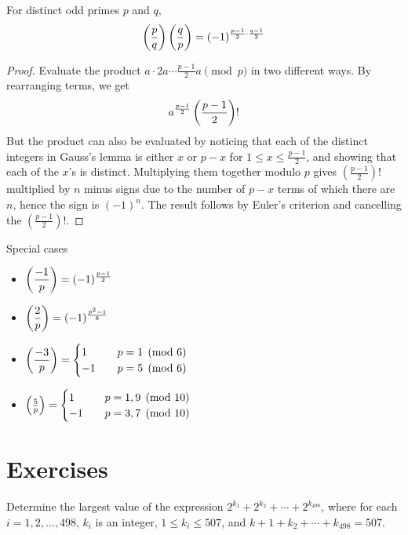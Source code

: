 \begin{theorem}
For distinct odd primes $p$ and $q$, 
\begin{equation}
\left(\dfrac{p}{q}\right) \left(\dfrac{q}{p}\right) = (-1)^{\frac{p-1}{2}\cdot\frac{q-1}{2}}
\end{equation}
\end{theorem}

\begin{proof}
Evaluate the product $a \cdot 2a \cdots \frac{p-1}{2}a \pmod p$ in two different ways. By rearranging terms, we get
\[a^\frac{p-1}{2} \left(\frac{p-1}{2}\right)!\]
But the product can also be evaluated by noticing that each of the distinct integers in Gauss's lemma is either $x$ or $p-x$ for $1 \le x \le \frac{p-1}{2}$, and showing that each of the $x$'s is distinct. Multiplying them together modulo $p$ gives $(\frac{p-1}{2})!$ multiplied by $n$ minus signs due to the number of $p-x$ terms of which there are $n$, hence the sign is $(-1)^n$. The result follows by Euler's criterion and cancelling the $(\frac{p-1}{2})!$.
\end{proof}

Special cases
\begin{itemize}
\item $\left(\dfrac{-1}{p}\right) = (-1)^{\frac{p-1}{2}}$
\item $\left(\dfrac{2}{p}\right) = (-1)^{\frac{p^2-1}{8}}$
\item $\left(\dfrac{-3}{p}\right) = \begin{cases}
    1 & \quad p=1\pmod 6 \\
    -1 & \quad p=5\pmod 6
\end{cases}$
\item $\left(\frac{5}{p}\right) = \begin{cases}
    1 & \quad p=1,9\pmod {10} \\
    -1 & \quad p=3,7\pmod {10}
\end{cases}$
\end{itemize}
\pagebreak

\section*{Exercises}
\begin{prbm}
\end{prbm}

\begin{prbm}
Determine the largest value of the expression $2^{k_1}+2^{k_2}+\cdots+2^{k_{498}}$, where for each $i=1,2,\dots,498$, $k_i$ is an integer, $1\le k_i\le507$, and $k+1+k_2+\cdots+k_{498}=507$.
\end{prbm}

